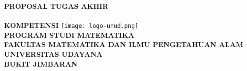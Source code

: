 \begin{titlepage}
    \centering
    \textbf{PROPOSAL TUGAS AKHIR}\\\vfill
    \textbf{\MakeUppercase{\Judul}}\\\vfill
    \textbf{KOMPETENSI \MakeUppercase{\Kompetensi}}\vfill
    \texttt{[image: logo-unud.png]}\vfill
    \textbf{\MakeUppercase{\Nama}}\\
    \textbf{\NIM}\vfill
    \textbf{
        PROGRAM STUDI MATEMATIKA\\
        FAKULTAS MATEMATIKA DAN ILMU PENGETAHUAN ALAM\\
        UNIVERSITAS UDAYANA\\
        BUKIT JIMBARAN\\
        \the\year
    }\\\vfill
\end{titlepage}